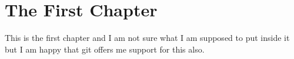 \chapter{The First Chapter}
This is the first chapter and I am not sure what I am supposed to put inside it but I am happy that git offers me support for this also.